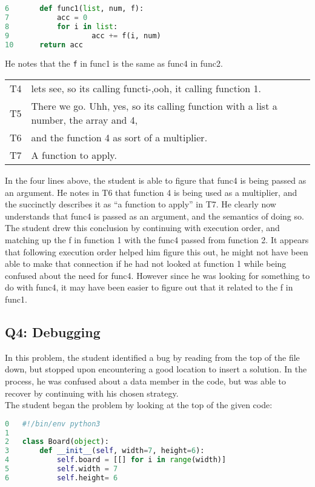 \begin{lstlisting}[language=python]
6		def func1(list, num, f):
7			acc = 0
8			for i in list:
9					acc += f(i, num)
10		return acc
\end{lstlisting}

He notes that the \texttt{f} in func1 is the same as func4 in func2. \\

\begin{tabular}{lp{13cm}}
T4& lets see, so its calling functi-,ooh, it calling function 1.\\
T5&There we go. Uhh, yes, so its calling function with a list a number, the array and 4,\\
T6&and the function 4 as sort of a multiplier.\\
T7&A function to apply. \\
\end{tabular}

In the four lines above, the student is able to figure that func4 is being passed as an argument.
He notes in T6 that function 4 is being used as a multiplier, and the succinctly describes it as ``a function to apply'' in T7.
He clearly now understands that func4 is passed as an argument, and the semantics of doing so.
The student drew this conclusion by continuing with execution order, and matching up the f in function 1 with the func4 passed from function 2.
It appears that following execution order helped him figure this out, he might not have been able to make that connection if he had not looked at function 1 while being confused about the need for func4.
However since he was looking for something to do with func4, it may have been easier to figure out that it related to the f in func1.

\subsection{Q4: Debugging}
In this problem, the student identified a bug by reading from the top of the file down, but stopped upon encountering a good location to insert a solution. In the process, he was confused about a data member in the code, but was able to recover by continuing with his chosen strategy. \\

The student began the problem by looking at the top of the given code:
\begin{lstlisting}[language=python]
0 	#!/bin/env python3
1
2 	class Board(object):
3 		def __init__(self, width=7, height=6):
4 			self.board = [[] for i in range(width)]
5 			self.width = 7
6 			self.height= 6
\end{lstlisting}

